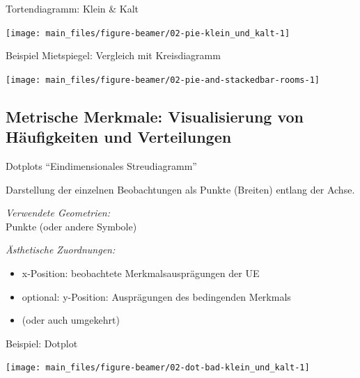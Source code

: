 \documentclass[
  10pt,
  ignorenonframetext,
]{beamer}
\providecommand{\tightlist}{%
  \setlength{\itemsep}{0pt}\setlength{\parskip}{0pt}}
\begin{document}
\begin{frame}{Tortendiagramm: Klein \& Kalt}
\label{tortendiagramm-klein-kalt}
\scriptsize

\begin{center}\texttt{[image: main\_files/figure-beamer/02-pie-klein\_und\_kalt-1]} \end{center}

\normalsize
\end{frame}

\begin{frame}{Beispiel Mietspiegel: Vergleich mit Kreisdiagramm}
\label{beispiel-mietspiegel-vergleich-mit-kreisdiagramm}
\scriptsize

\begin{center}\texttt{[image: main\_files/figure-beamer/02-pie-and-stackedbar-rooms-1]} \end{center}

\normalsize
\end{frame}

\subsection{Metrische Merkmale: Visualisierung von Häufigkeiten und
Verteilungen}\label{metrische-merkmale-visualisierung-von-huxe4ufigkeiten-und-verteilungen}

\begin{frame}{Dotplots}
\label{dotplots}
``Eindimensionales Streudiagramm''

Darstellung der einzelnen Beobachtungen als Punkte (Breiten) entlang der
Achse.

\emph{Verwendete Geometrien:}\\
Punkte (oder andere Symbole)

\emph{Ästhetische Zuordnungen:}

\begin{itemize}
\tightlist
\item
  x-Position: beobachtete Merkmalsausprägungen der UE
\item
  optional: y-Position: Ausprägungen des bedingenden Merkmals
\item
  (oder auch umgekehrt)
\end{itemize}
\end{frame}

\begin{frame}{Beispiel: Dotplot}
\label{beispiel-dotplot}
\scriptsize

\begin{center}\texttt{[image: main\_files/figure-beamer/02-dot-bad-klein\_und\_kalt-1]} \end{center}

\normalsize
\end{frame}
\end{document}
